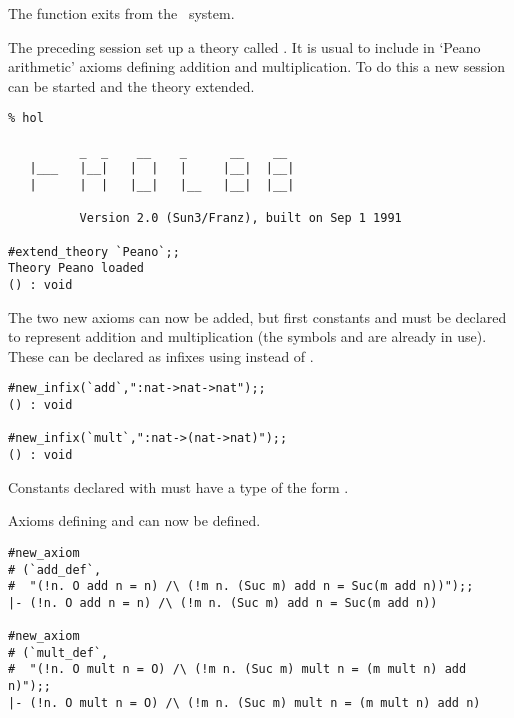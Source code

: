 {\noindent The function  exits from the \HOL\ system.

The preceding session set up a theory called . It is usual
to include in `Peano arithmetic' axioms defining addition and multiplication.
To do this a new session can be started and the theory extended.

\begin{session}\begin{verbatim}
% hol

          _  _    __    _      __    __
   |___   |__|   |  |   |     |__|  |__|
   |      |  |   |__|   |__   |__|  |__|
   
          Version 2.0 (Sun3/Franz), built on Sep 1 1991 

#extend_theory `Peano`;;
Theory Peano loaded
() : void
\end{verbatim}\end{session}

\noindent The two new axioms can now be added, but first constants  and
 must  be  declared  to  represent  addition  and  multiplication (the
symbols \ml{+}  and  \ml{*}  are  already in  use).   These can  be declared as
infixes using  instead of .

\begin{session}\begin{verbatim}
#new_infix(`add`,":nat->nat->nat");;
() : void

#new_infix(`mult`,":nat->(nat->nat)");;
() : void
\end{verbatim}\end{session}

\noindent Constants declared with 
must have a type of the form
\ml{$\sigma$->($\sigma$->$\sigma$)}.

Axioms defining  and  can now be defined.

\begin{session}\begin{verbatim}
#new_axiom
# (`add_def`, 
#  "(!n. O add n = n) /\ (!m n. (Suc m) add n = Suc(m add n))");;
|- (!n. O add n = n) /\ (!m n. (Suc m) add n = Suc(m add n))

#new_axiom
# (`mult_def`, 
#  "(!n. O mult n = O) /\ (!m n. (Suc m) mult n = (m mult n) add n)");;
|- (!n. O mult n = O) /\ (!m n. (Suc m) mult n = (m mult n) add n)
\end{verbatim}\end{session}

}
